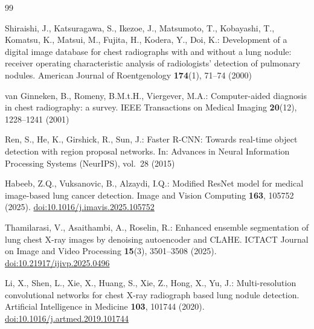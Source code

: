 \documentclass[11pt]{article}
\begin{document}
\begin{thebibliography}{99}

Shiraishi, J., Katsuragawa, S., Ikezoe, J., Matsumoto, T., Kobayashi, T.,
Komatsu, K., Matsui, M., Fujita, H., Kodera, Y., Doi, K.:
Development of a digital image database for chest radiographs with and
without a lung nodule: receiver operating characteristic analysis of
radiologists' detection of pulmonary nodules.
American Journal of Roentgenology \textbf{174}(1), 71--74 (2000)

van Ginneken, B., Romeny, B.M.t.H., Viergever, M.A.:
Computer-aided diagnosis in chest radiography: a survey.
IEEE Transactions on Medical Imaging \textbf{20}(12), 1228--1241 (2001)

Ren, S., He, K., Girshick, R., Sun, J.:
Faster R-CNN: Towards real-time object detection with region proposal
networks.
In: Advances in Neural Information Processing Systems (NeurIPS), vol.~28 (2015)

Habeeb, Z.Q., Vuksanovic, B., Alzaydi, I.Q.:
Modified ResNet model for medical image-based lung cancer detection.
Image and Vision Computing \textbf{163}, 105752 (2025).
\href{https://doi.org/10.1016/j.imavis.2025.105752}{doi:10.1016/j.imavis.2025.105752}

Thamilarasi, V., Asaithambi, A., Roselin, R.:
Enhanced ensemble segmentation of lung chest X-ray images by denoising
autoencoder and CLAHE.
ICTACT Journal on Image and Video Processing \textbf{15}(3), 3501--3508 (2025).
\href{https://doi.org/10.21917/ijivp.2025.0496}{doi:10.21917/ijivp.2025.0496}

Li, X., Shen, L., Xie, X., Huang, S., Xie, Z., Hong, X., Yu, J.:
Multi-resolution convolutional networks for chest X-ray radiograph based
lung nodule detection.
Artificial Intelligence in Medicine \textbf{103}, 101744 (2020).
\href{https://doi.org/10.1016/j.artmed.2019.101744}{doi:10.1016/j.artmed.2019.101744}

\end{thebibliography}
\end{document}
